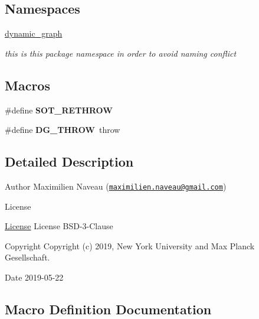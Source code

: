 \subsection*{Namespaces}
\begin{DoxyCompactItemize}
\item 
 \hyperlink{namespacedynamic__graph}{dynamic\+\_\+graph}
\begin{DoxyCompactList}\small\item\em this is this package namespace in order to avoid naming conflict \end{DoxyCompactList}\end{DoxyCompactItemize}
\subsection*{Macros}
\begin{DoxyCompactItemize}
\item 
\#define {\bfseries S\+O\+T\+\_\+\+R\+E\+T\+H\+R\+OW}
\item 
\mbox{\label{exception-abstract_8hh_af37158a4ed07567f1673457ea2656a34}} 
\#define {\bfseries D\+G\+\_\+\+T\+H\+R\+OW}~throw
\end{DoxyCompactItemize}


\subsection{Detailed Description}
\begin{DoxyAuthor}{Author}
Maximilien Naveau (\href{mailto:maximilien.naveau@gmail.com}{\tt maximilien.\+naveau@gmail.\+com}) 
\end{DoxyAuthor}
\begin{DoxyRefDesc}{License}
\item[\hyperlink{license__license000006}{License}]License B\+S\+D-\/3-\/\+Clause \end{DoxyRefDesc}
\begin{DoxyCopyright}{Copyright}
Copyright (c) 2019, New York University and Max Planck Gesellschaft. 
\end{DoxyCopyright}
\begin{DoxyDate}{Date}
2019-\/05-\/22 
\end{DoxyDate}


\subsection{Macro Definition Documentation}
\mbox{\label{exception-abstract_8hh_aba67729ca33a61234a4ca01d1e070125}} 
